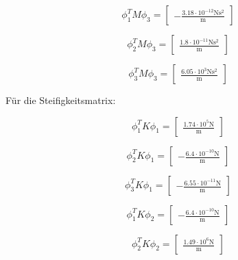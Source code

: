 \documentclass[
  letterpaper,
  DIV=11]{scrreprt}
\begin{document}
\begin{equation}\phi_{1}^{T} M \phi_{3} = \left[\begin{matrix}- \frac{3.18 \cdot 10^{-12} \text{N} \text{s}^{2}}{\text{m}}\end{matrix}\right]\end{equation}

\begin{equation}\phi_{2}^{T} M \phi_{3} = \left[\begin{matrix}\frac{1.8 \cdot 10^{-11} \text{N} \text{s}^{2}}{\text{m}}\end{matrix}\right]\end{equation}

\begin{equation}\phi_{3}^{T} M \phi_{3} = \left[\begin{matrix}\frac{6.05 \cdot 10^{3} \text{N} \text{s}^{2}}{\text{m}}\end{matrix}\right]\end{equation}

Für die Steifigkeitsmatrix:

\begin{equation}\phi_{1}^{T} K \phi_{1} = \left[\begin{matrix}\frac{1.74 \cdot 10^{5} \text{N}}{\text{m}}\end{matrix}\right]\end{equation}

\begin{equation}\phi_{2}^{T} K \phi_{1} = \left[\begin{matrix}- \frac{6.4 \cdot 10^{-10} \text{N}}{\text{m}}\end{matrix}\right]\end{equation}

\begin{equation}\phi_{3}^{T} K \phi_{1} = \left[\begin{matrix}- \frac{6.55 \cdot 10^{-11} \text{N}}{\text{m}}\end{matrix}\right]\end{equation}

\begin{equation}\phi_{1}^{T} K \phi_{2} = \left[\begin{matrix}- \frac{6.4 \cdot 10^{-10} \text{N}}{\text{m}}\end{matrix}\right]\end{equation}

\begin{equation}\phi_{2}^{T} K \phi_{2} = \left[\begin{matrix}\frac{1.49 \cdot 10^{6} \text{N}}{\text{m}}\end{matrix}\right]\end{equation}
\end{document}
